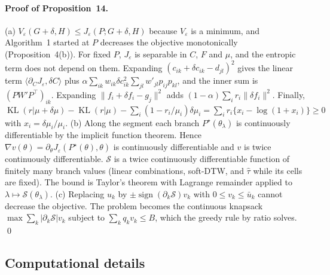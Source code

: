 \documentclass[12pt]{article}
\newcommand{\KL}{\operatorname{KL}}
\begin{document}
\paragraph{Proof of Proposition~14.}
(a) $V_\varepsilon(G+\delta,H)\le J_\varepsilon(P;G+\delta,H)$ because $V_\varepsilon$ is a minimum, and Algorithm~1 started at $P$ decreases the objective monotonically (Proposition~4(b)). For fixed $P$, $J_\varepsilon$ is separable in $C$, $F$ and $\mu$, and the entropic term does not depend on them. Expanding $(c_{ik}+\delta c_{ik}-d_{jl})^2$ gives the linear term $\langle\partial_CJ_\varepsilon,\delta C\rangle$ plus $\alpha\sum_{ik}w_{ik}\delta c_{ik}^2\sum_{jl}w'_{jl}p_{ij}p_{kl}$, and the inner sum is $(PW'P^\top)_{ik}$. Expanding $\|f_i+\delta f_i-g_j\|^2$ adds $(1-\alpha)\sum_ir_i\|\delta f_i\|^2$. Finally, $\KL(r|\mu+\delta\mu)-\KL(r|\mu)-\sum_i(1-r_i/\mu_i)\delta\mu_i=\sum_ir_i\{x_i-\log(1+x_i)\}\ge0$ with $x_i=\delta\mu_i/\mu_i$.
(b) Along the segment each branch $P^\star(\theta_\lambda)$ is continuously differentiable by the implicit function theorem. Hence $\nabla v(\theta)=\partial_\theta J_\varepsilon(P^\star(\theta),\theta)$ is continuously differentiable and $v$ is twice continuously differentiable. $\mathcal S$ is a twice continuously differentiable function of finitely many branch values (linear combinations, soft-DTW, and $\hat\tau$ while its cells are fixed). The bound is Taylor's theorem with Lagrange remainder applied to $\lambda\mapsto\mathcal S(\theta_\lambda)$.
(c) Replacing $u_k$ by $\pm\operatorname{sign}(\partial_k\mathcal S)v_k$ with $0\le v_k\le\bar u_k$ cannot decrease the objective. The problem becomes the continuous knapsack $\max\sum_k|\partial_k\mathcal S|v_k$ subject to $\sum_kq_kv_k\le B$, which the greedy rule by ratio solves. \qed

\subsection{Computational details}
\end{document}
